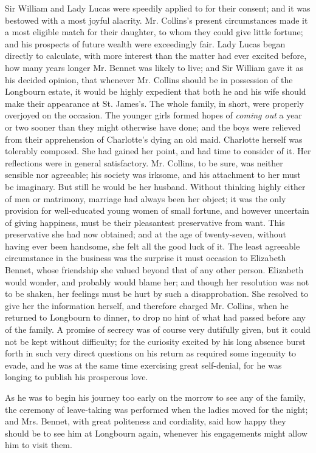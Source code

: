 Sir William and Lady Lucas were speedily applied to for their consent; and it was bestowed with a most joyful alacrity. Mr. Collins's present circumstances made it a most eligible match for their daughter, to whom they could give little fortune; and his prospects of future wealth were exceedingly fair. Lady Lucas began directly to calculate, with more interest than the matter had ever excited before, how many years longer Mr. Bennet was likely to live; and Sir William gave it as his decided opinion, that whenever Mr. Collins should be in possession of the Longbourn estate, it would be highly expedient that both he and his wife should make their appearance at St. James's. The whole family, in short, were properly overjoyed on the occasion. The younger girls formed hopes of {\em coming out} a year or two sooner than they might otherwise have done; and the boys were relieved from their apprehension of Charlotte's dying an old maid. Charlotte herself was tolerably composed. She had gained her point, and had time to consider of it. Her reflections were in general satisfactory. Mr. Collins, to be sure, was neither sensible nor agreeable; his society was irksome, and his attachment to her must be imaginary. But still he would be her husband. Without thinking highly either of men or matrimony, marriage had always been her object; it was the only provision for well-educated young women of small fortune, and however uncertain of giving happiness, must be their pleasantest preservative from want. This preservative she had now obtained; and at the age of twenty-seven, without having ever been handsome, she felt all the good luck of it. The least agreeable circumstance in the business was the surprise it must occasion to Elizabeth Bennet, whose friendship she valued beyond that of any other person. Elizabeth would wonder, and probably would blame her; and though her resolution was not to be shaken, her feelings must be hurt by such a disapprobation. She resolved to give her the information herself, and therefore charged Mr. Collins, when he returned to Longbourn to dinner, to drop no hint of what had passed before any of the family. A promise of secrecy was of course very dutifully given, but it could not be kept without difficulty; for the curiosity excited by his long absence burst forth in such very direct questions on his return as required some ingenuity to evade, and he was at the same time exercising great self-denial, for he was longing to publish his prosperous love.

As he was to begin his journey too early on the morrow to see any of the family, the ceremony of leave-taking was performed when the ladies moved for the night; and Mrs. Bennet, with great politeness and cordiality, said how happy they should be to see him at Longbourn again, whenever his engagements might allow him to visit them.

